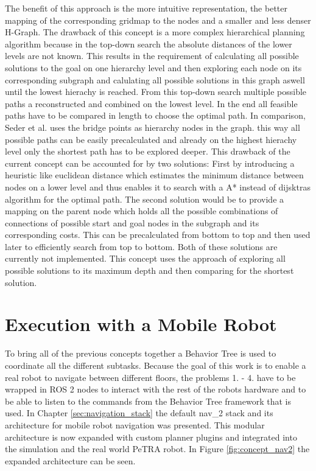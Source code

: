 The benefit of this approach is the more intuitive representation, the better mapping of the corresponding gridmap to the nodes and a smaller and less denser H-Graph. The drawback of this concept is a more complex hierarchical planning algorithm because in the top-down search the absolute distances of the lower levels are not known. This results in the requirement of calculating all possible solutions to the goal on one hierarchy level and then exploring each node on its corresponding subgraph and calulating all possible solutions in this graph aswell until the lowest hierachy is reached. From this top-down search multiple possible paths a reconstructed and combined on the lowest level. In the end all feasible paths have to be compared in length to choose the optimal path. In comparison, Seder et al. \cite{seder_hierarchical_2011} uses the bridge points as hierarchy nodes in the graph. this way all possible paths can be easily precalculated and already on the highest hierachy level only the shortest path has to be explored deeper. This drawback of the current concept can be accounted for by two solutions: First by introducing a heuristic like euclidean distance which estimates the minimum distance between nodes on a lower level and thus enables it to search with a A* instead of dijsktras algorithm for the optimal path. The second solution would be to provide a mapping on the parent node which holds all the possible combinations of connections of possible start and goal nodes in the subgraph and its corresponding costs. This can be precalculated from bottom to top and then used later to efficiently search from top to bottom. Both of these solutions are currently not implemented. This concept uses the approach of exploring all possible solutions to its maximum depth and then comparing for the shortest solution.

\section{Execution with a Mobile Robot}
\label{sec:execution}
To bring all of the previous concepts together a Behavior Tree is used to coordinate all the different subtasks. Because the goal of this work is to enable a real robot to navigate between different floors, the problems 1. - 4. have to be wrapped in ROS 2 nodes to interact with the rest of the robots hardware and to be able to listen to the commands from the Behavior Tree framework that is used. In Chapter \ref{sec:navigation_stack} the default \gls{nav_2} stack and its architecture for mobile robot navigation was presented. This modular architecture is now expanded with custom planner plugins and integrated into the simulation and the real world PeTRA robot. In Figure \ref{fig:concept_nav2} the expanded architecture can be seen. 


